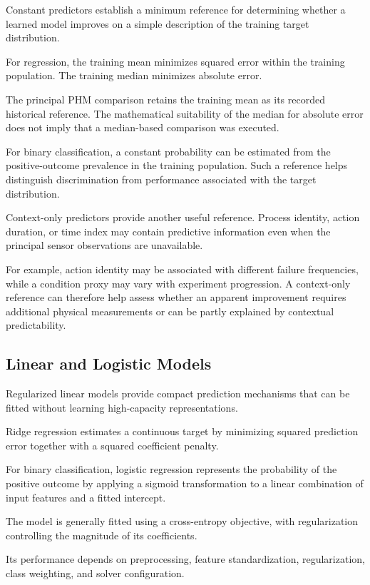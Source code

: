 Constant predictors establish a minimum reference for determining whether a learned model improves on a simple description of the training target distribution.

For regression, the training mean minimizes squared error within the training population. The training median minimizes absolute error.

The principal PHM comparison retains the training mean as its recorded historical reference. The mathematical suitability of the median for absolute error does not imply that a median-based comparison was executed.

For binary classification, a constant probability can be estimated from the positive-outcome prevalence in the training population. Such a reference helps distinguish discrimination from performance associated with the target distribution.

Context-only predictors provide another useful reference. Process identity, action duration, or time index may contain predictive information even when the principal sensor observations are unavailable.

For example, action identity may be associated with different failure frequencies, while a condition proxy may vary with experiment progression. A context-only reference can therefore help assess whether an apparent improvement requires additional physical measurements or can be partly explained by contextual predictability.

\subsection{Linear and Logistic Models}

Regularized linear models provide compact prediction mechanisms that can be fitted without learning high-capacity representations.

Ridge regression estimates a continuous target by minimizing squared prediction error together with a squared coefficient penalty.

For binary classification, logistic regression represents the probability of the positive outcome by applying a sigmoid transformation to a linear combination of input features and a fitted intercept.

The model is generally fitted using a cross-entropy objective, with regularization controlling the magnitude of its coefficients.

Its performance depends on preprocessing, feature standardization, regularization, class weighting, and solver configuration.


